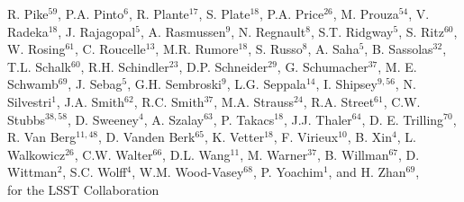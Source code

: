 {R. Pike$^{59}$,
P.A. Pinto$^{6}$,
R. Plante$^{17}$,
S. Plate$^{18}$,
P.A. Price$^{26}$,
M. Prouza$^{54}$,
V. Radeka$^{18}$,
J. Rajagopal$^5$,
A. Rasmussen$^9$,
N. Regnault$^8$,
S.T. Ridgway$^5$,
S. Ritz$^{60}$,
W. Rosing$^{61}$,
C. Roucelle$^{13}$,
M.R. Rumore$^{18}$,
S. Russo$^8$,
A. Saha$^{5}$,
B. Sassolas$^{32}$,
T.L. Schalk$^{60}$,
R.H. Schindler$^{23}$,
D.P. Schneider$^{29}$,
G. Schumacher$^{37}$,
M. E. Schwamb$^{69}$,
J. Sebag$^5$,
G.H. Sembroski$^9$,
L.G. Seppala$^{14}$,
I. Shipsey$^{9,56}$,
N. Silvestri$^1$,
J.A. Smith$^{62}$,
R.C. Smith$^{37}$,
M.A. Strauss$^{24}$,
R.A. Street$^{61}$,
C.W. Stubbs$^{38,58}$,
D. Sweeney$^4$,
A. Szalay$^{63}$,
P. Takacs$^{18}$,
J.J. Thaler$^{64}$,
D. E. Trilling$^{70}$,
R. Van Berg$^{11,48}$,
D. Vanden Berk$^{65}$,
K. Vetter$^{18}$,
F. Virieux$^{10}$,
B. Xin$^4$,
L. Walkowicz$^{26}$,
C.W. Walter$^{66}$,
D.L. Wang$^{11}$,
M. Warner$^{37}$,
B. Willman$^{67}$,
D. Wittman$^2$,
S.C. Wolff$^4$,
W.M. Wood-Vasey$^{68}$,
P. Yoachim$^1$,
and H. Zhan$^{69}$, \\
for the LSST Collaboration
}
\affil{}

